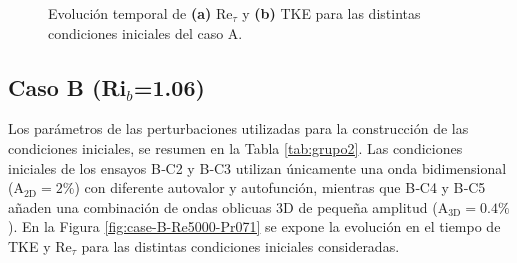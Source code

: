\begin{figure}[H]
  \centering  

  \caption{Evolución temporal de \textbf{(a)} Re$_{\tau}$ y \textbf{(b)} TKE para las distintas condiciones iniciales del caso A.}
  \label{fig:case-A-Re5000-Pr071}
\end{figure}



\subsection{Caso B (Ri$_b$=1.06)}

Los parámetros de las perturbaciones utilizadas para la construcción de las condiciones iniciales, se resumen en la Tabla \ref{tab:grupo2}. Las condiciones iniciales de los ensayos B‑C2 y B‑C3 utilizan únicamente una onda bidimensional ($\text{A}_{\text{2D}}=2 \%$) con diferente autovalor y autofunción, mientras que B‑C4 y B‑C5 añaden una combinación de ondas oblicuas 3D de pequeña amplitud ($\text{A}_{\text{3D}}= 0\text{.}4\%$). En la Figura \ref{fig:case-B-Re5000-Pr071} se expone la evolución en el tiempo de TKE y Re$_{\tau}$ para las distintas condiciones iniciales consideradas.  

